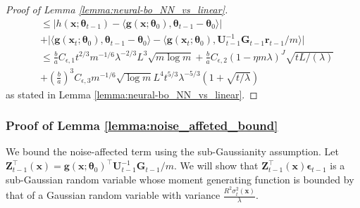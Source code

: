 \begin{proof}[Proof of Lemma \ref{lemma:neural-bo_NN_vs_linear}]
\begin{align*}
        & \leq  \left \lvert h(\mathbf{x}; \boldsymbol{\theta}_{t-1}) - \langle \mathbf{g}(\mathbf{x}; \boldsymbol{\theta}_0), \boldsymbol{\theta}_{t-1} - \boldsymbol{\theta}_0 \rangle  \right\rvert \\ 
        &  + \lvert \langle\mathbf{g}(\mathbf{x}_{t};\boldsymbol{\theta}_{0}),\boldsymbol{\theta}_{t-1}-\boldsymbol{\theta}_{0}\rangle-\langle\mathbf{g}(\mathbf{x}_{t};\boldsymbol{\theta}_{0}),\mathbf{U}_{t-1}^{-1}\mathbf{G}_{t-1}\mathbf{r}_{t-1}/m\rangle \rvert \\
        & \leq \frac{b}{a} C_{\epsilon,1}   t^{2/3}m^{-1/6}\lambda^{-2/3} L^{3}\sqrt{m\log m} + \frac{b}{a} C_{\epsilon,2} (1-\eta m\lambda)^{J} \sqrt{tL/(\lambda)} \\  
        & +\left(\frac{b}{a} \right)^3 C_{\epsilon,3} m^{-1/6} \sqrt{\log m} L^4 t^{5/3} \lambda ^{-5/3} \left(1 + \sqrt{t/\lambda} \right)  
\end{align*} 
as stated in Lemma \ref{lemma:neural-bo_NN_vs_linear}.
\end{proof}

\subsubsection{Proof of Lemma \ref{lemma:noise_affeted_bound}}
\label{lemma:neural-bo_noise_affeted_bound_proof}
    
We bound the noise-affected term using the sub-Gaussianity assumption. Let $\mathbf{Z}_{t-1}^\top(\mathbf{x})  = \mathbf{g}(\mathbf{x}; \boldsymbol{\theta}_0)^\top \mathbf{U}^{-1}_{t-1} \mathbf{G}_{t-1} /m$. We will show that $\mathbf{Z}_{t-1}^\top(\mathbf{x}) \boldsymbol{\epsilon}_{t-1}$ is a sub-Gaussian random variable whose moment generating function is bounded by that
of a Gaussian random variable with variance $\frac{R^2\sigma_{t}^2(\mathbf{x})}{\lambda}$.

